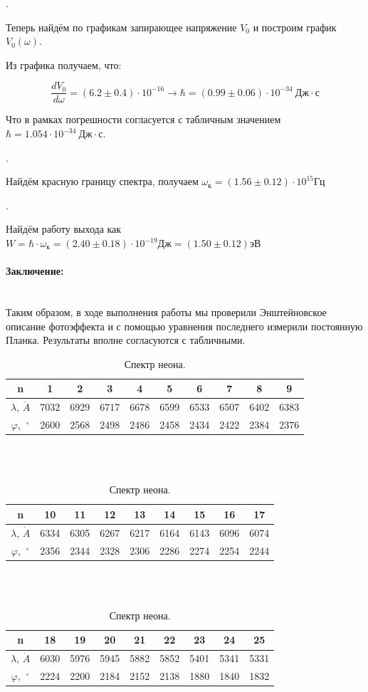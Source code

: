 \documentclass[a4paper, 12pt]{article}
\renewcommand{\phi}{\varphi}
\renewcommand{\AA}{\ensuremath{\mathring{A}}}
\newcommand{\parag}[1]{\paragraph*{#1:}}
\newcounter{Points}
\newcommand{\point}{\arabic{Points}. \addtocounter{Points}{1}}
\begin{document}
\point Теперь найдём по графикам запирающее напряжение $V_0$ и построим график $V_0(\omega)$.

Из графика получаем, что:

\[
    \frac{dV_0}{d\omega} = (6.2 \pm 0.4) \cdot 10^{-16} \rightarrow \hbar = (0.99 \pm 0.06) \cdot 10^{-34} ~Дж \cdot с
\]

Что в рамках погрешности согласуется с табличным значением $\hbar = 1.054 \cdot 10^{-34} ~Дж \cdot с$.

\point Найдём красную границу спектра, получаем $\omega_к = (1.56 \pm 0.12) \cdot 10^{15} Гц$

\point Найдём работу выхода как $W = \hbar \cdot \omega_к = (2.40 \pm 0.18) \cdot 10^{-19} Дж = (1.50 \pm 0.12) эВ$

\parag {Заключение} ~\\
Таким образом, в ходе выполнения работы мы проверили Энштейновское описание фотоэффекта и с помощью уравнения последнего измерили постоянную Планка. Результаты вполне согласуются с табличными.

\begin{table}[H]
    \centering
    \begin{tabular}{|c|c|c|c|c|c|c|c|c|c|}
        \hline
        n & 1 & 2 & 3 & 4 & 5 & 6 & 7 & 8 & 9 \\ \hline
        $\lambda$, $\AA$ & 7032 & 6929 & 6717 & 6678 & 6599 & 6533 & 6507 & 6402 & 6383 \\ \hline
        $\phi$, $~^\circ$ & 2600 & 2568 & 2498 & 2486 & 2458 & 2434 & 2422 & 2384 & 2376 \\ \hline
    \end{tabular}
    \\~\\
    \begin{tabular}{|c|c|c|c|c|c|c|c|c|}
        \hline
        n & 10 & 11 & 12 & 13 & 14 & 15 & 16 & 17 \\ \hline
        $\lambda$, $\AA$ & 6334 & 6305 & 6267 & 6217 & 6164 & 6143 & 6096 & 6074 \\ \hline
        $\phi$, $~^\circ$ & 2356 & 2344 & 2328 & 2306 & 2286 & 2274 & 2254 & 2244 \\ \hline
    \end{tabular}
    \\~\\
    \begin{tabular}{|c|c|c|c|c|c|c|c|c|}
        \hline
        n & 18 & 19 & 20 & 21 & 22 & 23 & 24 & 25 \\ \hline
        $\lambda$, $\AA$ & 6030 & 5976 & 5945 & 5882 & 5852 & 5401 & 5341 & 5331 \\ \hline
        $\phi$, $~^\circ$ & 2224 & 2200 & 2184 & 2152 & 2138 & 1880 & 1840 & 1832
        \\ \hline
    \end{tabular}
    \caption {Спектр неона.}
    \label{tab:neon}
\end{table}
\end{document}
